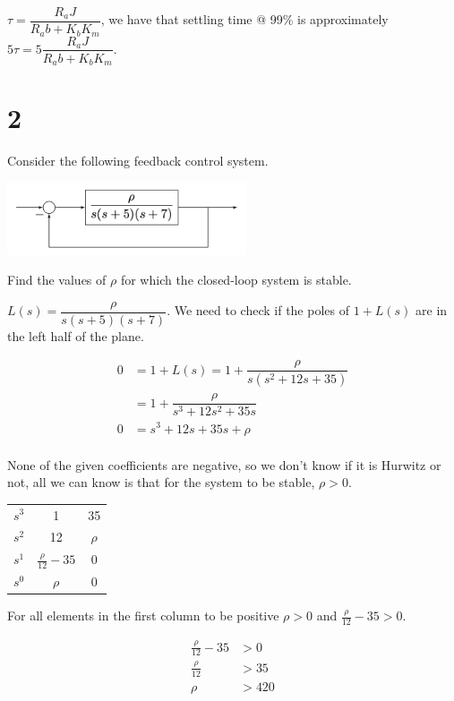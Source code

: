 \documentclass[11pt]{article}
\begin{document}
$\tau = \dfrac{R_a J}{R_a b + K_b K_m}$, we have that settling time @ 99\% is approximately $5 \tau = 5 \dfrac{R_a J}{R_a b + K_b K_m}$.

\section{2} 

Consider the following feedback control system.

\includegraphics[width=200pt]{a3_q2.png}

Find the values of $\rho$ for which the closed-loop system is stable.

$L(s) = \dfrac{\rho}{s(s + 5)(s + 7)}$. We need to check if the poles of $1 + L(s)$ are in the left half of the plane.

\begin{align*}
  0 &= 1 + L(s) = 1 + \dfrac{\rho}{s(s^2 + 12s + 35)} \\
  &= 1 + \dfrac{\rho}{s^3 + 12s^2 + 35s} \\
  0 &= s^3 + 12s + 35s + \rho \\
\end{align*}

None of the given coefficients are negative, so we don't know if it is Hurwitz or not, all we can know is that for the system to be stable, $\rho > 0$.

\begin{table}[h]
  \centering
  \begin{tabular}{|c|c|c|}
  \hline
  $s^3$ & 1 & 35 \\
  $s^2$ & 12 & $\rho$ \\
  $s^1$ & $\frac{\rho}{12} - 35$ & 0 \\
  $s^0$ & $\rho$ & 0 \\
  \hline
  \end{tabular}
\end{table}

For all elements in the first column to be positive $\rho > 0$ and $\frac{\rho}{12} - 35 > 0$.

\begin{align*}
  \frac{\rho}{12} - 35 &> 0 \\
  \frac{\rho}{12} &> 35 \\
  \rho &> 420 \\
\end{align*}
\end{document}
